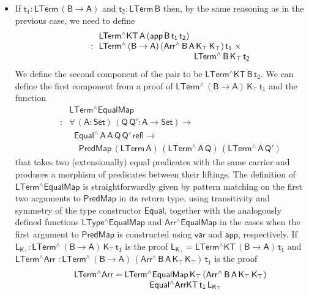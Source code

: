 \documentclass[sigplan,10pt,anonymous,review]{acmart}
\begin{document}
\begin{itemize}
\item If $\mathsf{t_1 : LTerm\,(B \to A)}$ and $\mathsf{t_2 :
  LTerm\,B}$ then, by the same reasoning as in the previous case, we
  need to define
  \[\begin{array}{ll}
 & \!\! \mathsf{LTerm^\wedge KT\,A\, (app\, B \, t_1\,t_2)}\\
\quad\quad : &\!\! \mathsf{LTerm^{\wedge}\, (B \to A)\, (Arr^{\wedge} \, B\, A\,
  K_\top \, K_\top)\, t_1\; \times}\\
 & \hspace*{1.5in} \mathsf{LTerm^{\wedge}\, B\, K_\top\, t_2}
  \end{array}\]
  We define the second component of the pair to be
  $\mathsf{LTerm^\wedge KT\,B\,t_2}$. We can define the first
  component from a proof of $\mathsf{LTerm^{\wedge}\, (B \to A)\,
    K_\top\, t_1}$ and the function
  \[\begin{array}{ll}
  & \!\! \mathsf{LTerm^\wedge EqualMap}\\
  \quad\quad : &
  \!\!\mathsf{\forall\, (A : Set)\, (Q\,Q' : A \to
    Set) \to}\\
  & \;\;\mathsf{Equal^\wedge\,A\,A\,Q\,Q'\,refl \to}\\
  &  \;\;\;\;\mathsf{PredMap\,(LTerm\,A)\,
    (LTerm^{\wedge}\,A\,Q)\,(LTerm^{\wedge}\,A\,Q')}
  \end{array}\] that takes two
  (extensionally) equal predicates with the same carrier and produces
  a morphism of predicates between their liftings. The definition of
  $\mathsf{LTerm^\wedge EqualMap}$ is straightforwardly given by
  pattern matching on the first two arguments to $\mathsf{PredMap}$ in
  its return type, using transitivity and symmetry of the type
  constructor $\mathsf{Equal}$, together with the analogously defined
  functions $\mathsf{LType^\wedge EqualMap}$ and $\mathsf{Arr^\wedge
    EqualMap}$ in the cases when the first argument to
  $\mathsf{PredMap}$ is constructed using $\mathsf{var}$ and
  $\mathsf{app}$, respectively. If $\mathsf{L_{K_\top} :
    LTerm^{\wedge}\, (B \to A) \, K_\top\, t_1}$ is the proof
  $\mathsf{L_{K_\top} = LTerm^\wedge KT\, (B \to A)\, t_1}$ and
  $\mathsf{ LTerm^\wedge Arr}$ $\mathsf{: LTerm^{\wedge}\, (B \to A)\,
    (Arr^{\wedge} \, B\, A\, K_\top \, K_\top)\, t_1}$ is the proof
  \[\begin{array}{l}
   \quad\quad  \mathsf{LTerm^\wedge Arr = LTerm^\wedge
    EqualMap\,K_\top\,(Arr^{\wedge}\,B\,A\,K_\top\,K_\top)}\\
  \hspace*{1.5in} \mathsf{Equal^\wedge ArrKT\, t_1\, L_{K_\top}}

\end{array}\]
\end{itemize}
\end{document}
